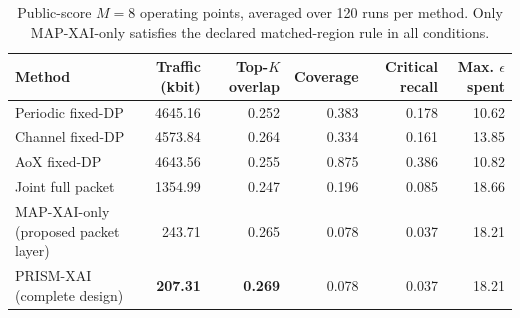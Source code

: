 \documentclass[10pt,conference]{IEEEtran}
\begin{document}
\begin{table}[htbp]
\caption{Public-score $M=8$ operating points, averaged over 120 runs per method.
Only MAP-XAI-only satisfies the declared matched-region rule in all conditions.}
\label{tab:allmethods}
\centering\small
\begin{tabular}{lrrrrr}
\toprule
Method & Traffic (kbit) & Top-$K$ overlap & Coverage & Critical recall & Max. $\epsilon$ spent\\ \midrule
Periodic fixed-DP & 4645.16 & 0.252 & 0.383 & 0.178 & 10.62\\
Channel fixed-DP & 4573.84 & 0.264 & 0.334 & 0.161 & 13.85\\
AoX fixed-DP & 4643.56 & 0.255 & 0.875 & 0.386 & 10.82\\
Joint full packet & 1354.99 & 0.247 & 0.196 & 0.085 & 18.66\\ \midrule
MAP-XAI-only (proposed packet layer) & 243.71 & 0.265 & 0.078 & 0.037 & 18.21\\
PRISM-XAI (complete design) & \textbf{207.31} & \textbf{0.269} & 0.078 & 0.037 & 18.21\\
\bottomrule
\end{tabular}
\end{table}

\begin{table}[htbp]
\caption{Primary results by dataset (60 runs per row).}
\label{tab:dataset}
\centering\small
{}
\end{table}

\begin{table}[htbp]
\caption{Paired PRISM-XAI minus MAP-XAI-only results for public-score $M=8$
($n=120$). CI denotes the 95\% half-width.}
\label{tab:primarypaired}
\centering\small
{}
\end{table}
\end{document}
